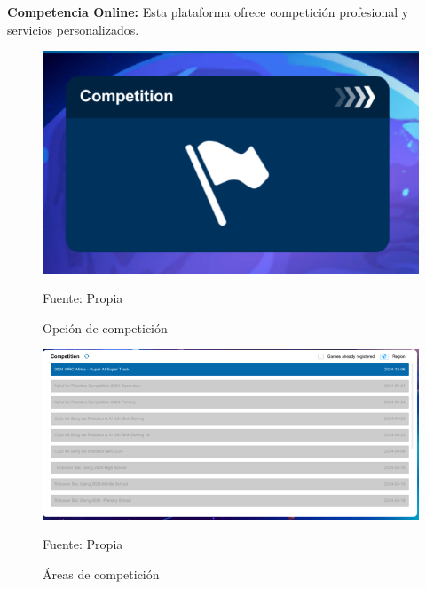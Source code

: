\textbf{Competencia Online:} Esta plataforma ofrece competición profesional y servicios personalizados.

\begin{figure}[H]
    \centering
    \includegraphics[scale = 0.90]{Imagenes/competir.png}
    \caption{Opción de competición}{Fuente: Propia}
\end{figure}

\begin{figure}[H]
    \centering
    \includegraphics[scale = 0.90]{Imagenes/areas_comp.png}
    \caption{Áreas de competición}{Fuente: Propia}
\end{figure}